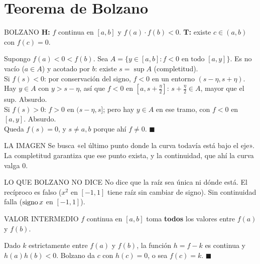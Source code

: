 \section{Teorema de Bolzano}
\agregado
\begin{sello}{BOLZANO}
\textbf{H:} $f$ continua en $[a,b]$ y $f(a)\cdot f(b)<0$. \quad \textbf{T:} existe $c\in(a,b)$ con $f(c)=0$.
\end{sello}
\begin{demo}
Supongo $f(a)<0<f(b)$. Sea $A=\{y\in[a,b]:f<0\text{ en todo }[a,y]\}$. Es no vacío ($a\in A$) y acotado por $b$: existe $s=\sup A$ (completitud).\\[2pt]
Si $f(s)<0$: por conservación del signo, $f<0$ en un entorno $(s-\eta,s+\eta)$. Hay $y\in A$ con $y>s-\eta$, así que $f<0$ en $[a,s+\frac\eta2]$: $s+\frac\eta2\in A$, mayor que el sup. Absurdo.\\[2pt]
Si $f(s)>0$: $f>0$ en $(s-\eta,s]$; pero hay $y\in A$ en ese tramo, con $f<0$ en $[a,y]$. Absurdo.\\[2pt]
Queda $f(s)=0$, y $s\neq a,b$ porque ahí $f\neq0$. $\blacksquare$
\end{demo}
\begin{tip}{LA IMAGEN}
Se busca «el último punto donde la curva todavía está bajo el eje». La completitud garantiza que ese punto exista, y la continuidad, que ahí la curva valga 0.
\end{tip}
\begin{memo}{LO QUE BOLZANO NO DICE}
No dice que la raíz sea única ni dónde está. El recíproco es falso ($x^2$ en $[-1,1]$ tiene raíz sin cambiar de signo). Sin continuidad falla ($\operatorname{signo} x$ en $[-1,1]$).
\end{memo}

\agregado
\begin{sello}{VALOR INTERMEDIO}
$f$ continua en $[a,b]$ toma \textbf{todos} los valores entre $f(a)$ y $f(b)$.
\end{sello}
\begin{demo}
Dado $k$ estrictamente entre $f(a)$ y $f(b)$, la función $h=f-k$ es continua y $h(a)h(b)<0$. Bolzano da $c$ con $h(c)=0$, o sea $f(c)=k$. $\blacksquare$
\end{demo}

